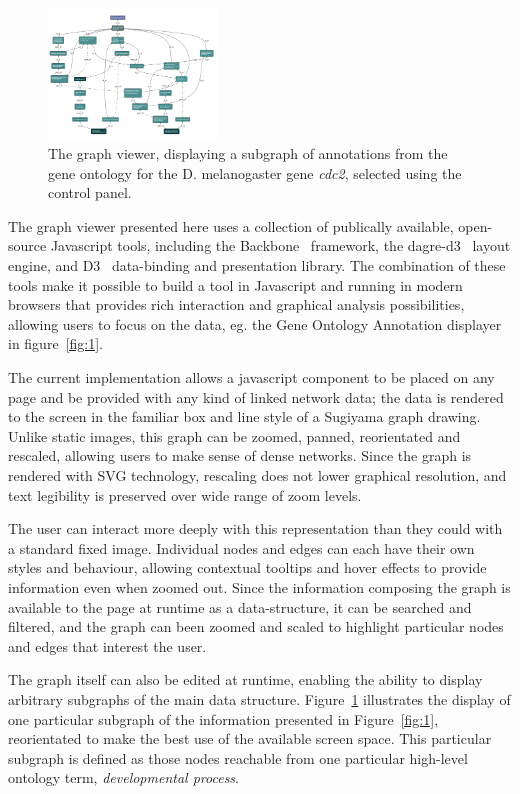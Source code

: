 \documentclass[10pt,a4paper,twocolumn]{article}
\begin{document}
\begin{figure}[htb]
\centering
\includegraphics[width=0.4\textwidth]{dagify-subgraph.png}
\caption{\label{fig:2}The graph viewer, displaying a subgraph of annotations from the gene ontology for the D. melanogaster gene \emph{cdc2}, selected using the control panel.}
\end{figure}

The graph viewer presented here uses a collection of publically available, open-source
Javascript tools, including the Backbone~\cite{backbone} framework, the dagre-d3~\cite{dagre-d3}
layout engine, and D3~\cite{d3} data-binding and presentation
library. The combination of these tools make it possible to build a tool in Javascript
and running in modern browsers that provides rich interaction and graphical analysis
possibilities, allowing users to focus on the data, eg. the Gene Ontology Annotation
displayer in figure~\ref{fig:1}.

The current implementation allows a javascript component to be placed on any page
and be provided with any kind of linked network data; the data is rendered
to the screen in the familiar box and line style of a Sugiyama graph drawing. Unlike
static images, this graph can be zoomed, panned, reorientated and rescaled, allowing users to
make sense of dense networks. Since the graph is rendered with SVG technology, rescaling
does not lower graphical resolution, and text legibility is preserved over wide range of zoom
levels.

The user can interact more deeply with this representation than they could with a standard
fixed image. Individual nodes and edges can each have their own styles and behaviour, allowing
contextual tooltips and hover effects to provide information even when zoomed out. Since the
information composing the graph is available to the page at runtime as a data-structure, it can
be searched and filtered, and the graph can been zoomed and scaled to highlight particular nodes
and edges that interest the user.

The graph itself can also be edited at runtime, enabling the ability to display arbitrary 
subgraphs of the main data structure. Figure~\ref{fig:2} illustrates the display of one 
particular subgraph of the information presented in Figure~\ref{fig:1}, reorientated to make the 
best use of the available screen space. This particular subgraph is defined as those nodes 
reachable from one particular high-level ontology term, \emph{developmental process}.
\end{document}
